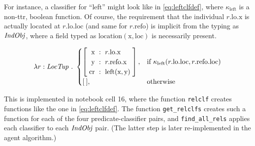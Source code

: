 For instance, a classifier for ``left'' might look like in \autoref{eq:leftclfdef}, where $\kappa_\text{left}$ is a non-\gls{ttr}, boolean function.
Of course, the requirement that the individual $r.\text{lo}.\text{x}$ is actually located at $r.\text{lo}.\text{loc}$ (and same for $r.\text{refo}$) is implicit from the typing as $\mathit{IndObj}$, where a field typed as $\text{location}(\text{x}, \text{loc})$ is necessarily present.

\begin{equation}\label{eq:leftclfdef}
\lambda r : \type{LocTup} \ .\ 
\begin{cases}
\rec{
    \text{x} &:& r.\text{lo}.\text{x} \\
    \text{y} &:& r.\text{refo}.\text{x} \\
    \text{cr} &:& \text{left}(\text{x}, \text{y}) \\
},
& \text{if } \kappa_\text{left}(r.\text{lo}.\text{loc}, r.\text{refo}.\text{loc}) \\
[\:], & \text{otherwise}
\end{cases}
\end{equation}

This is implemented in notebook cell 16, where the function \texttt{relclf} creates functions like the one in \autoref{eq:leftclfdef}.
The function \texttt{get\_relclfs} creates such a function for each of the four predicate-classifier pairs, and \texttt{find\_all\_rels} applies each classifier to each $\mathit{IndObj}$ pair.
(The latter step is later re-implemented in the agent algorithm.)

